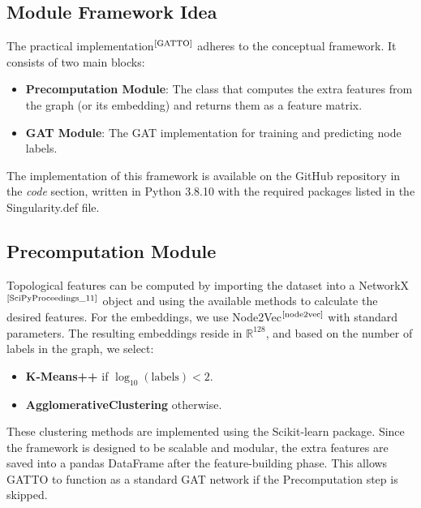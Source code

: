 \documentclass[12pt,conference]{ieeeconf} %
\begin{document}
\subsection{Module Framework Idea}
The practical implementation$^{\text{\cite{GATTO}}}$ adheres to the conceptual framework. It consists of two main blocks:
\begin{itemize}
    \item \textbf{Precomputation Module}: The class that computes the extra features from the graph (or its embedding) and returns them as a feature matrix.
    \item \textbf{GAT Module}: The GAT implementation for training and predicting node labels.
\end{itemize}
The implementation of this framework is available on the GitHub repository in the \textit{code} section, written in Python 3.8.10 with the required packages listed in the Singularity.def file.
\subsection{Precomputation Module}
Topological features can be computed by importing the dataset into a NetworkX$^{\text{\cite{SciPyProceedings_11}}}$ object and using the available methods to calculate the desired features. For the embeddings, we use Node2Vec$^\text{\cite{node2vec}}$ with standard parameters. The resulting embeddings reside in $\mathbb{R}^{128}$, and based on the number of labels in the graph, we select:
\begin{itemize}
    \item \textbf{K-Means++} if $\log_{10}{(\text{labels})} < 2$.
    \item \textbf{AgglomerativeClustering} otherwise.
\end{itemize}
These clustering methods are implemented using the Scikit-learn package.
Since the framework is designed to be scalable and modular, the extra features are saved into a pandas DataFrame after the feature-building phase. This allows GATTO to function as a standard GAT network if the Precomputation step is skipped.
\end{document}

